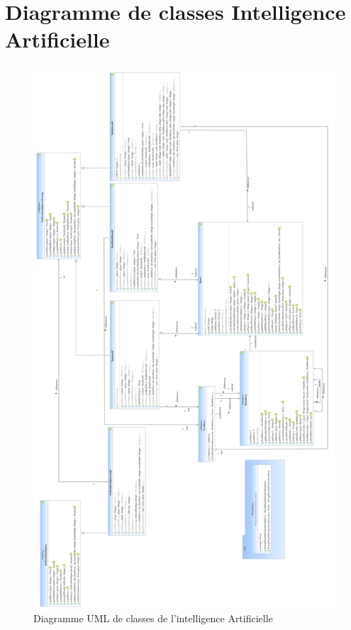 \documentclass[a4paper,12pt]{report}
\begin{document}
\section{Diagramme de classes Intelligence Artificielle}
\label{clsAI}
\begin{figure}[H]
\centering
  \includegraphics[scale=0.23]{Architecture/ArtificialIntelligence.png}
\caption{Diagramme UML de classes de l'intelligence Artificielle}
\end{figure}
\end{document}
